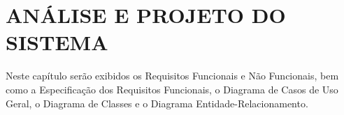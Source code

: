 
\chapter{ANÁLISE E PROJETO DO SISTEMA}
\label{chap:analise}
Neste capítulo serão exibidos os Requisitos Funcionais e Não Funcionais, bem como a Especificação dos Requisitos Funcionais, o Diagrama de Casos de Uso Geral, o Diagrama de Classes e o Diagrama Entidade-Relacionamento.


\clearpage


\clearpage


\clearpage


\clearpage


\clearpage


\clearpage


\clearpage


\clearpage